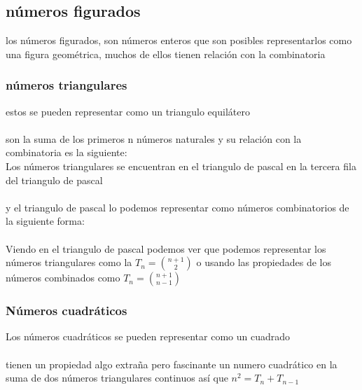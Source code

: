 \subsection{números figurados}
los números figurados, son números enteros  que son posibles representarlos como una figura geométrica, muchos de ellos tienen relación con la combinatoria
\subsubsection{números triangulares}
estos se pueden representar como un triangulo equilátero
\\
\\son la suma de los primeros n números naturales y su relación con la combinatoria es la siguiente:
\\Los números triangulares se encuentran en el triangulo de pascal en la tercera fila del triangulo de pascal
\\
\\y el triangulo de pascal lo podemos representar como números combinatorios de la siguiente forma:
\\
\\Viendo en el triangulo de pascal podemos ver que podemos representar los números triangulares como la  $T_{n}=\binom{n+1}{2} $ o usando las propiedades de los números combinados como   $T_{n}=\binom{n+1}{n-1}$
\subsubsection{Números cuadráticos}
Los números cuadráticos se pueden representar como un cuadrado
\\
\\tienen un propiedad  algo extraña pero fascinante un numero cuadrático en la suma de dos números triangulares continuos así que $n^{2} = T_{n} + T_{n-1}$
